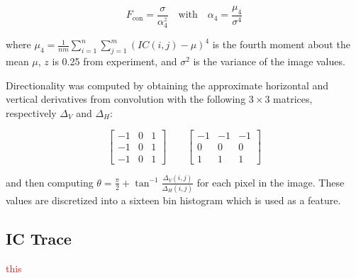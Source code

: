 \documentclass[11pt]{article}
\newcommand{\todo}[1]{\textcolor{red}{#1}}
\begin{document}
$$
F_\text{con} = \frac{\sigma}{\alpha_4^z} \quad \text{with} \quad \alpha_4 = \frac{\mu_4}{\sigma^4}
$$

\noindent
where $\mu_4 = \frac{1}{nm} \sum_{i=1}^n \sum_{j=1}^m (IC(i,j)-\mu)^4$
is the fourth moment about the mean $\mu$, $z$ is \num{0.25} from experiment, and $\sigma^2$ is the variance of the image values.

Directionality was computed by obtaining the approximate horizontal and vertical derivatives from convolution with the following $3\times3$ matrices, respectively $\Delta_V$ and $\Delta_H$:

$$
\begin{bmatrix}
-1 & 0 & 1 \\ -1 & 0 & 1 \\ -1 & 0 & 1
\end{bmatrix} \qquad
\begin{bmatrix}
-1 & -1 & -1 \\
0 & 0 & 0 \\
1 & 1 & 1
\end{bmatrix}
$$

\noindent
and then computing $\theta = \frac{\pi}{2} + \tan^{-1}\frac{\Delta_V(i,j)}{\Delta_H(i,j)}$ for each pixel in the image.
These values are discretized into a sixteen bin histogram which is used as a feature.

\subsection{IC Trace}

\todo{this}

        

\end{document}
